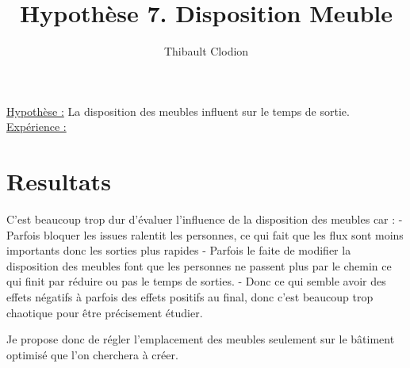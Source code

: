 \documentclass[12pt]{article}
\title{Hypothèse 7. Disposition Meuble}
\author{Thibault Clodion}
\begin{document}
\maketitle %

\underline{Hypothèse :} La disposition des meubles influent sur le temps de sortie.
\newline\newline
\underline{Expérience :}
\newline


\section{Resultats}

C'est beaucoup trop dur d'évaluer l'influence de la disposition des meubles car :
\newline - Parfois bloquer les issues ralentit les personnes, ce qui fait que les flux sont moins importants donc les sorties plus rapides
\newline - Parfois le faite de modifier la disposition des meubles font que les personnes ne passent plus par le chemin ce qui finit par réduire ou pas le temps de sorties.
\newline - Donc ce qui semble avoir des effets négatifs à parfois des effets positifs au final, donc c'est beaucoup trop chaotique pour être précisement étudier.
\newline\newline

Je propose donc de régler l'emplacement des meubles seulement sur le bâtiment optimisé que l'on cherchera à créer.
\end{document}
